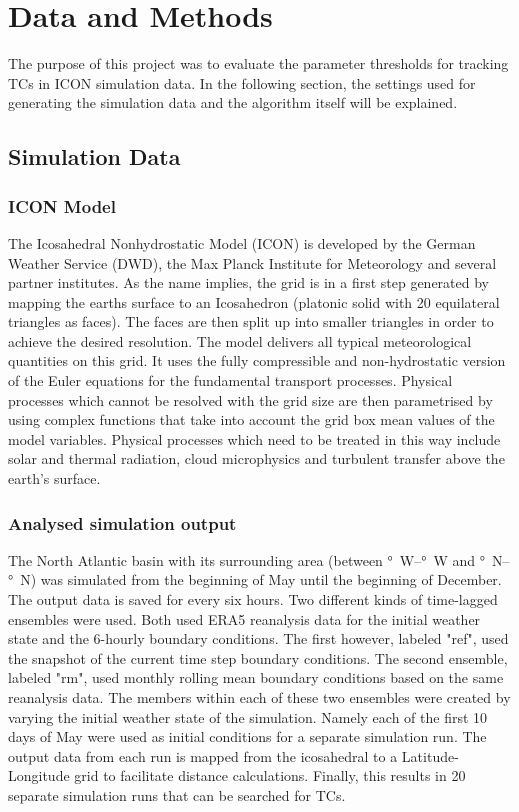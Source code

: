 \chapter{Data and Methods}
\label{sec:methods}
The purpose of this project was to evaluate the parameter thresholds for
tracking TCs in ICON simulation data. In the following section, the settings
used for generating the simulation data and the algorithm itself will be
explained.
\section{Simulation Data}
\label{sec:data}
\subsection*{ICON Model}
The Icosahedral Nonhydrostatic Model (ICON) is developed by the German Weather
Service (DWD), the Max Planck Institute for Meteorology and several partner
institutes. As the name implies, the grid is in a first step generated by
mapping the earths surface to an Icosahedron (platonic solid with 20
equilateral triangles as faces). The faces are then split up into smaller
triangles in order to achieve the desired resolution. The model delivers
all typical meteorological quantities on this grid.
It uses the fully compressible and non-hydrostatic version of the Euler
equations for the fundamental transport processes. Physical processes which
cannot be resolved with the grid size are then parametrised by using complex
functions that take into account the grid box mean values of the model
variables. Physical processes which need to be treated in this way include
solar and thermal radiation, cloud microphysics and turbulent transfer above
the earth's surface.\cite{dwd-icon}

\subsection*{Analysed simulation output}
The North Atlantic basin with its surrounding area (between \unit[120]{\degree W}--\unit[15]{\degree W} and \unit[0]{\degree N}--\unit[70]{\degree N}) was simulated from the beginning of May until the beginning of December. The
output data is saved for every six hours.
Two different kinds of time-lagged ensembles were used. Both used ERA5
reanalysis data for the initial weather state and the 6-hourly boundary
conditions. The first however, labeled "ref", used the snapshot of the current time step boundary conditions. The second ensemble, labeled "rm", used
monthly rolling mean boundary conditions based on the same reanalysis data.
The members within each of these two ensembles were created by varying the
initial weather state of the simulation. Namely each of the first 10 days of
May were used as initial conditions for a separate simulation run.
The output data from each run is mapped from the icosahedral to a
Latitude-Longitude grid to facilitate distance calculations.
Finally, this results in 20 separate simulation runs that can be searched for
TCs.

